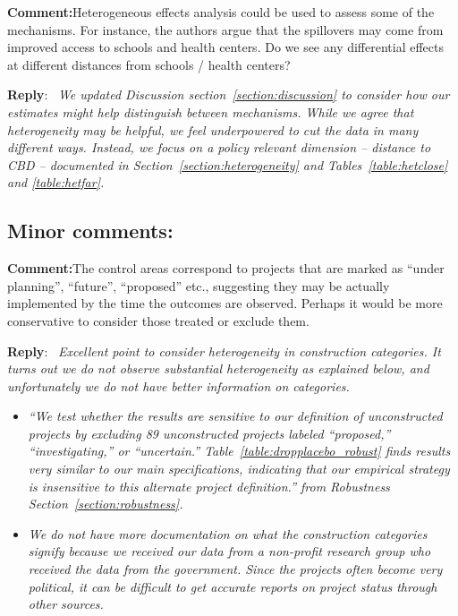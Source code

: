 \documentclass{article}
\newcounter{reviewer}
\newcounter{point}[reviewer]
\newcommand{\reply}{\medskip \noindent \textbf{Reply}:\ \textit }
\newcommand{\sr}{\begin{minipage}{\dimexpr\textwidth-3cm}}
\newcommand{\er}{\end{minipage}}
\newcommand{\cc}{\medskip \noindent \textbf{Comment:}\hspace{2em}}
\begin{document}
\cc Heterogeneous effects analysis could be used to assess some of the mechanisms. For instance, the authors argue that the spillovers may come from improved access to schools and health centers. Do we see any differential effects at different distances from schools / health centers?

\sr
\reply{ We updated Discussion section~\ref{section:discussion} to consider how our estimates might help distinguish between mechanisms. While we agree that heterogeneity may be helpful, we feel underpowered to cut the data in many different ways.  Instead, we focus on a policy relevant dimension -- distance to CBD -- documented in Section~\ref{section:heterogeneity} and Tables~\ref{table:hetclose} and \ref{table:hetfar}. }\\
\er

\subsection{Minor comments:}

\cc The control areas correspond to projects that are marked as “under planning”, “future”, “proposed” etc., suggesting they may be actually implemented by the time the outcomes are observed. Perhaps it would be more conservative to consider those treated or exclude them.

\reply{ Excellent point to consider heterogeneity in construction categories. It turns out we do not observe substantial heterogeneity as explained below, and unfortunately we do not have better information on categories.  }
\begin{itemize}
    \item \textit{ ``We test whether the results are sensitive to our definition of unconstructed projects by excluding 89 unconstructed projects labeled ``proposed,'' ``investigating,'' or ``uncertain.'' Table~\ref{table:dropplacebo_robust} finds results very similar to our main specifications, indicating that our empirical strategy is insensitive to this alternate project definition.'' from Robustness Section~\ref{section:robustness}.}
    \item \textit{We do not have more documentation on what the construction categories signify because we received our data from a non-profit research group who received the data from the government.  Since the projects often become very political, it can be difficult to get accurate reports on project status through other sources. }
\end{itemize}  
\end{document}
